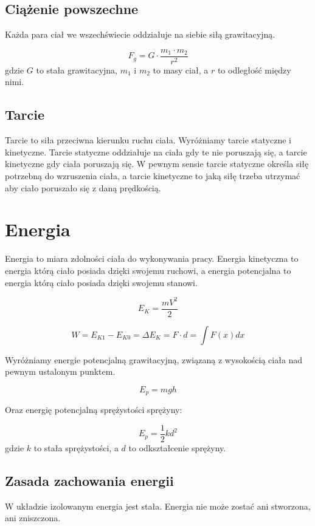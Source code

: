 \documentclass{../notatki}
\begin{document}
\subsection{Ciążenie powszechne}

Każda para ciał we wszechświecie oddziałuje na siebie siłą grawitacyjną.

$$
F_g = G \cdot \frac{m_1 \cdot m_2}{r^2}
$$
gdzie $G$ to stała grawitacyjna, $m_1$ i $m_2$ to masy ciał, a $r$ to odległość
między nimi.

\subsection{Tarcie}

Tarcie to siła przeciwna kierunku ruchu ciała. Wyróżniamy tarcie statyczne i
kinetyczne. Tarcie statyczne oddziałuje na ciała gdy te nie poruszają się, a
tarcie kinetyczne gdy ciała poruszają się. W pewnym sensie tarcie statyczne
określa siłę potrzebną do wzruszenia ciała, a tarcie kinetyczne to jaką siłę
trzeba utrzymać aby ciało poruszało się z daną prędkością.

\section{Energia}

Energia to miara zdolności ciała do wykonywania pracy. Energia kinetyczna to
energia którą ciało posiada dzięki swojemu ruchowi, a energia potencjalna to
energia którą ciało posiada dzięki swojemu stanowi.

$$
E_K = \frac{mV^2}{2}
$$

$$
W = E_{K1} - E_{K0} = \Delta E_K = F \cdot d = \int F(x) dx
$$

Wyróżniamy energie potencjalną grawitacyjną, związaną z wysokością ciała nad
pewnym ustalonym punktem.

$$
E_p = mgh
$$

Oraz energię potencjalną sprężystości sprężyny:

$$
E_p = \frac{1}{2}kd^2
$$
gdzie $k$ to stała sprężystości, a $d$ to odkształcenie sprężyny.

\subsection{Zasada zachowania energii}

W układzie izolowanym energia jest stała. Energia nie może zostać ani stworzona,
ani zniszczona.
\end{document}
